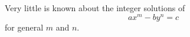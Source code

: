 \begin{proposition}
    Very little is known about the integer solutions of
\[
    ax^m-by^n=c
\]
    for general $m$ and $n$.
\end{proposition}

